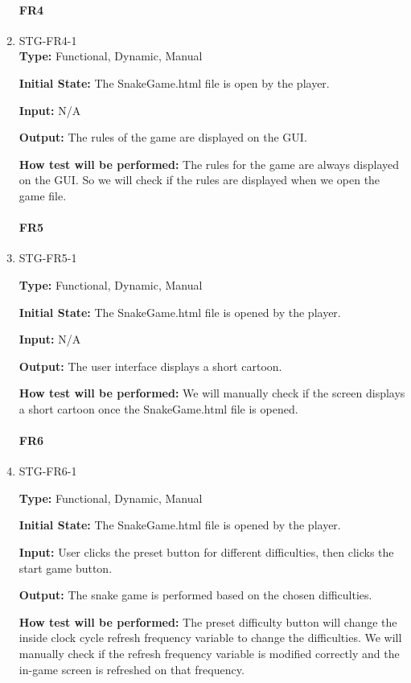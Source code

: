 \documentclass[12pt, titlepage]{article}
\begin{document}
\begin{enumerate}
\paragraph{FR4}
\item{STG-FR4-1\\}
\textbf{Type:} Functional, Dynamic, Manual

\textbf{Initial State:} The SnakeGame.html file is open by the player.

\textbf{Input:} N/A

\textbf{Output:} The rules of the game are displayed on the GUI.

\textbf{How test will be performed:} The rules for the game are always displayed on the GUI. So we will check if the rules are displayed when we open the game file.



\paragraph{FR5}
\item{STG-FR5-1\\}

\textbf{Type:} Functional, Dynamic, Manual

\textbf{Initial State:} The SnakeGame.html file is opened by the player.

\textbf{Input:} N/A

\textbf{Output:} The user interface displays a short cartoon.

\textbf{How test will be performed:} We will manually check if the screen displays a short cartoon once the SnakeGame.html file is opened.


\paragraph{FR6}

\item{STG-FR6-1\\}

\textbf{Type:} Functional, Dynamic, Manual

\textbf{Initial State:} The SnakeGame.html file is opened by the player.

\textbf{Input:} User clicks the preset button for different difficulties, then clicks the start game button. 

\textbf{Output:} The snake game is performed based on the chosen difficulties.

\textbf{How test will be performed:} The preset difficulty button will change the inside clock cycle refresh frequency variable to change the difficulties. We will manually check if the refresh frequency variable is modified correctly and the in-game screen is refreshed on that frequency.



\end{enumerate}
\end{document}
